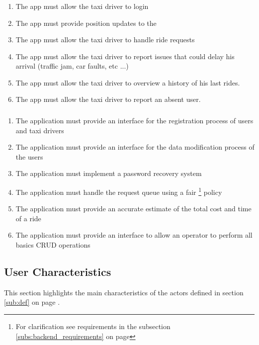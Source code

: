 \subsubsection{} 
\label{ssub:mobile_application_driver}
\begin{enumerate} [resume*]
	\item The app must allow the taxi driver to login
	\item  The app must provide position updates to the 
	\item  The app must allow the taxi driver to handle ride requests
	\item  The app must allow the taxi driver to report issues that could delay his arrival (traffic jam, car faults, etc ...)
	\item  The app must allow the taxi driver to overview a history of his last rides.
	\item  The app must allow the taxi driver to report an absent user.
\end{enumerate}

\subsubsection{} 
\label{ssub:back_end_application}
\begin{enumerate} [resume*]

	\item  The application must provide an interface for the registration process of users and taxi drivers
	\item The application must provide an interface for the data modification process of the users
	\item The application must implement a password recovery system
	\item  The application must handle the request queue using a fair \footnote{For clarification see requirements in the  subsection \ref{subs:backend_requirements} on page \pageref{subs:backend_requirements}} policy 
	\item  The application must provide an accurate estimate of the total cost and time of a ride
	\item  The application must provide an interface to allow an operator to perform all basics CRUD operations

\end{enumerate}

\subsection{User Characteristics} 
\label{sub:user_characteristics}
This section highlights the main characteristics of the actors defined in section \ref{sub:def} on page \pageref{sub:def}.

